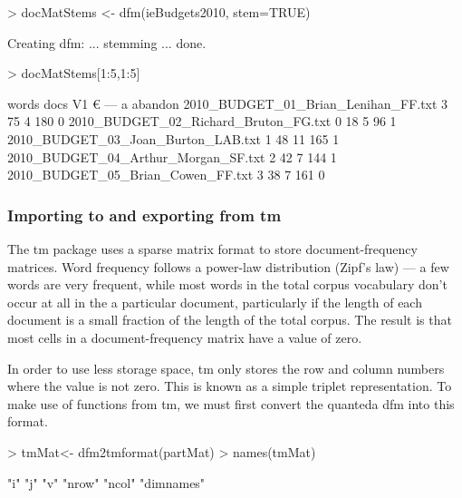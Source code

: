 \documentclass[11pt]{article}
\begin{document}
\begin{Schunk}
\begin{Sinput}
> docMatStems <- dfm(ieBudgets2010, stem=TRUE)
\end{Sinput}
\begin{Soutput}
Creating dfm: ... stemming ... done. 
\end{Soutput}
\begin{Sinput}
> docMatStems[1:5,1:5]
\end{Sinput}
\begin{Soutput}
                                      words
docs                                   V1  €  —   a abandon
  2010_BUDGET_01_Brian_Lenihan_FF.txt   3 75  4 180       0
  2010_BUDGET_02_Richard_Bruton_FG.txt  0 18  5  96       1
  2010_BUDGET_03_Joan_Burton_LAB.txt    1 48 11 165       1
  2010_BUDGET_04_Arthur_Morgan_SF.txt   2 42  7 144       1
  2010_BUDGET_05_Brian_Cowen_FF.txt     3 38  7 161       0
\end{Soutput}
\end{Schunk}

\subsubsection{Importing to and exporting from \textsf{tm}}

The \textsf{tm} package uses a sparse matrix format to store document-frequency matrices. Word frequency follows a power-law distribution (Zipf's law) --- a few words are very frequent, while most words in the total corpus vocabulary don't occur at all in the a particular document, particularly if the length of each document is a small fraction of the length of the total corpus.  The result is that most cells in a document-frequency matrix have a value of zero. 

In order to use less storage space, \textsf{tm} only stores the row and column numbers where the value is not zero. This is known as a simple triplet representation. To make use of functions from \textsf{tm}, we must first convert the quanteda dfm into this format. 

\begin{Schunk}
\begin{Sinput}
> tmMat<- dfm2tmformat(partMat)
> names(tmMat)
\end{Sinput}
\begin{Soutput}
[1] "i"        "j"        "v"        "nrow"     "ncol"     "dimnames"
\end{Soutput}
\end{Schunk}



\end{document}
